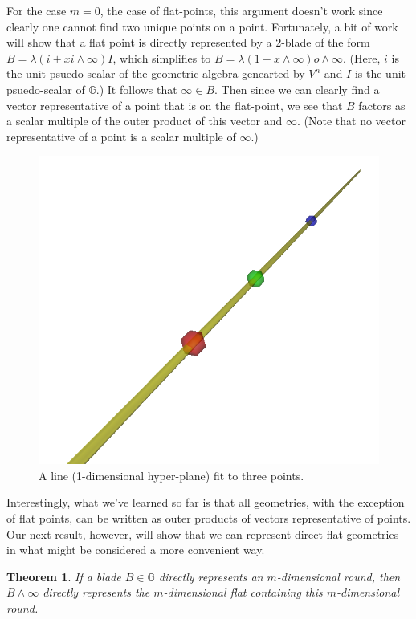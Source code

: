 \documentclass[12pt]{article}
\newcommand{\G}{\mathbb{G}}
\newcommand{\nvao}{o}
\newcommand{\nvai}{\infty}
\newtheorem{theorem}{Theorem}[section]
\begin{document}
For the case $m=0$, the case of flat-points, this argument doesn't work since clearly
one cannot find two unique points on a point.  Fortunately, a bit of work will show
that a flat point is directly represented by a 2-blade of the form $B=\lambda(i+xi\wedge\nvai)I$,
which simplifies to $B=\lambda(1-x\wedge\nvai)\nvao\wedge\nvai$.  (Here, $i$ is
the unit psuedo-scalar of the geometric algebra genearted by $V^n$ and $I$ is
the unit psuedo-scalar of $\G$.)  It follows that
$\nvai\in B$.  Then since we can clearly find a vector representative of a point
that is on the flat-point, we see that $B$ factors as a scalar multiple of the outer
product of this vector and $\nvai$.  (Note that no vector representative of a point
is a scalar multiple of $\nvai$.)
\begin{figure}[H]
\centering
\includegraphics[scale=0.3]{DirectLineFigure}
\caption{A line (1-dimensional hyper-plane) fit to three points.}
\end{figure}
Interestingly, what we've learned so far is that all geometries,
with the exception of flat points, can be written as outer products
of vectors representative of points.  Our next result, however, will
show that we can represent direct flat geometries in what might be
considered a more convenient way.
\begin{theorem}\label{thm_round_to_flat}
If a blade $B\in\G$ directly represents an $m$-dimensional round,
then $B\wedge\nvai$ directly represents the $m$-dimensional flat
containing this $m$-dimensional round.
\end{theorem}
\end{document}
